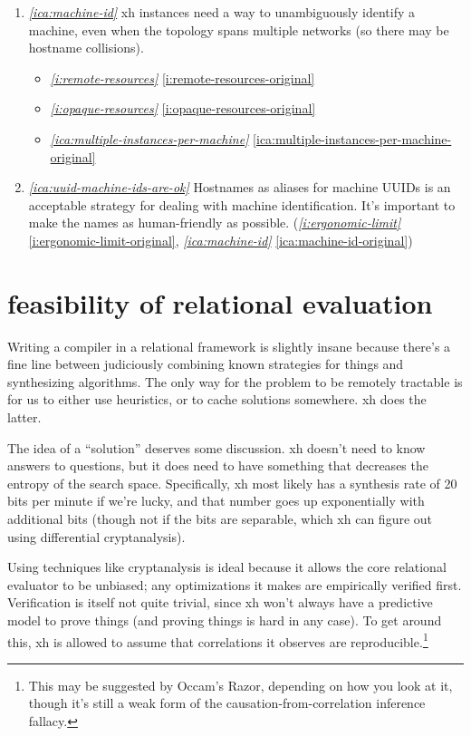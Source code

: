 \documentclass{report}
\makeatletter
\newcommand*{\Label}[2]{%
  \@bsphack
  \begingroup
    \label{#1-original}%
    \def\@currentlabel{#2}%
    \label{#1}%
  \endgroup
  \@esphack
}
\newcommand{\refboth}[1]{{\em \ref{#1}} \ref{#1-original}}
\makeatother
\begin{document}
\begin{enumerate}
\item{}\Label{ica:machine-id}{ca.machineid}{\em\ref{ica:machine-id}}
  xh instances need a way to unambiguously identify a machine, even when
  the topology spans multiple networks (so there may be hostname
  collisions).
\begin{itemize}
\item \refboth{i:remote-resources}
\item \refboth{i:opaque-resources}
\item \refboth{ica:multiple-instances-per-machine}
\end{itemize}
\item{}\Label{ica:uuid-machine-ids-are-ok}{ca.machineiduuid}{\em\ref{ica:uuid-machine-ids-are-ok}}
  Hostnames as aliases for machine UUIDs is an acceptable strategy for
  dealing with machine identification. It's important to make the names as
  human-friendly as possible.
(\refboth{i:ergonomic-limit}, \refboth{ica:machine-id})
\end{enumerate}

\chapter{feasibility of relational evaluation}\label{chp:relational-feasibility}
  Writing a compiler in a relational framework is slightly insane because
  there's a fine line between judiciously combining known strategies for things
  and synthesizing algorithms. The only way for the problem to be remotely
  tractable is for us to either use heuristics, or to cache solutions
  somewhere. xh does the latter.

  The idea of a ``solution'' deserves some discussion. xh doesn't need to know
  answers to questions, but it does need to have something that decreases the
  entropy of the search space. Specifically, xh most likely has a synthesis
  rate of 20 bits per minute if we're lucky, and that number goes up
  exponentially with additional bits (though not if the bits are separable,
  which xh can figure out using differential cryptanalysis).

  Using techniques like cryptanalysis is ideal because it allows the core
  relational evaluator to be unbiased; any optimizations it makes are
  empirically verified first. Verification is itself not quite trivial, since
  xh won't always have a predictive model to prove things (and proving things
  is hard in any case). To get around this, xh is allowed to assume that
  correlations it observes are reproducible.\footnote{This may be suggested by
    Occam's Razor, depending on how you look at it, though it's still a weak
    form of the causation-from-correlation inference fallacy.}
\end{document}

